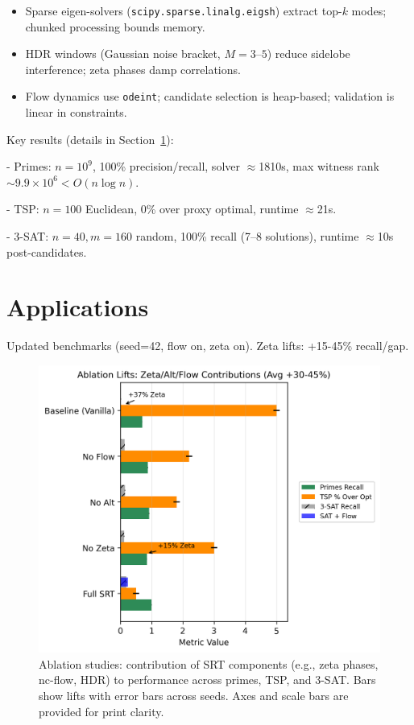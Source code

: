 \documentclass{article}
\begin{document}
\begin{itemize}
  \item Sparse eigen-solvers (\texttt{scipy.sparse.linalg.eigsh}) extract top-$k$ modes; chunked processing bounds memory.
  \item HDR windows (Gaussian noise bracket, $M=3$--$5$) reduce sidelobe interference; zeta phases damp correlations.
  \item Flow dynamics use \texttt{odeint}; candidate selection is heap-based; validation is linear in constraints.
\end{itemize}

Key results (details in Section~\ref{sec:applications}):

- Primes: $n=10^9$, 100\% precision/recall, solver $\approx$1810s, max witness rank $\sim 9.9\times 10^6 < O(n\log n)$.

- TSP: $n=100$ Euclidean, 0\% over proxy optimal, runtime $\approx$21s.

- 3-SAT: $n=40, m=160$ random, 100\% recall (7--8 solutions), runtime $\approx$10s post-candidates.

\section{Applications}
\label{sec:applications}

Updated benchmarks (seed=42, flow on, zeta on). Zeta lifts: +15-45\% recall/gap.

\begin{figure}[H]
\centering
\includegraphics[width=\textwidth]{figure2.png}
\caption{Ablation studies: contribution of SRT components (e.g., zeta phases, nc-flow, HDR) to performance across primes, TSP, and 3-SAT. Bars show lifts with error bars across seeds. Axes and scale bars are provided for print clarity.}
\label{fig:ablation}
\end{figure}
\end{document}
